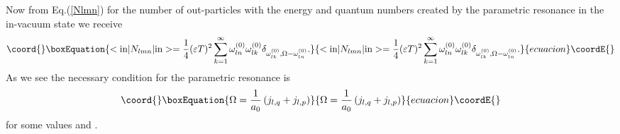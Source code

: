\documentclass[a4paper,11pt]{article}
\begin{document}
Now from Eq.(\ref{Nlmn}) for the number of out-particles with the energy \coordHE{} and quantum numbers \coordHE{} created by the parametric
resonance in the in-vacuum state we receive
\begin{equation}\coord{}\boxEquation{
<{\mathrm{in}}|N_{lmn}|{\mathrm{in}}>=\frac{1}{4}(\varepsilon
T)^{2}\sum_{k=1}^{\infty }\omega _{ln}^{(0)}\omega _{lk}^{(0)}\delta
_{\omega _{lk}^{(0)},\Omega -\omega _{ln}^{(0)}}.  \label{Nlmn2}
}{
<{\mathrm{in}}|N_{lmn}|{\mathrm{in}}>=\frac{1}{4}(\varepsilon
T)^{2}\sum_{k=1}^{\infty }\omega _{ln}^{(0)}\omega _{lk}^{(0)}\delta
_{\omega _{lk}^{(0)},\Omega -\omega _{ln}^{(0)}}.  }{ecuacion}\coordE{}\end{equation}
As we see the necessary condition for the parametric resonance is
\begin{equation}\coord{}\boxEquation{
\Omega =\frac{1}{a_{0}}\left( j_{l,q}+j_{l,p}\right)   \label{parrescond}
}{
\Omega =\frac{1}{a_{0}}\left( j_{l,q}+j_{l,p}\right)   }{ecuacion}\coordE{}\end{equation}
for some values \coordHE{} and \coordHE{}.
\end{document}
